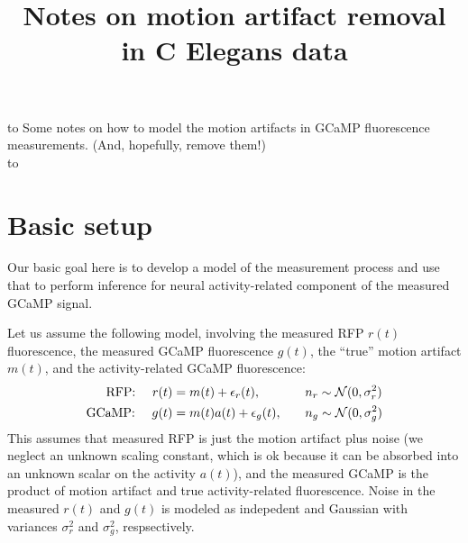 \documentclass[11pt]{article}
\newcommand{\vr}{\sigma^2_r}
\newcommand{\vg}{\sigma^2_g}
\begin{document}



\title{Notes on motion artifact removal in C Elegans data}

\maketitle

\hbox to \textwidth{\hrulefill} 
\vspace{-.1in}
Some notes on how to model the motion artifacts
in GCaMP fluorescence measurements. (And, hopefully, remove them!) \\
\hbox to \textwidth{\hrulefill}

\vspace{.5in}

\section{Basic setup}
Our basic goal here is to develop a model of the measurement process
and use that to perform inference for neural
activity-related component of the measured GCaMP signal.

Let us assume the following model, involving the measured RFP $r(t)$
fluorescence, the measured GCaMP fluorescence $g(t)$, the ``true''
motion artifact $m(t)$, and the activity-related GCaMP fluorescence:
\begin{alignat}{2}
\text{RFP: }\quad r(t) &= m(t) + \epsilon_r(t), \quad & & n_r \sim
\Nrm(0,\vr)  \label{eq:rfp} \\
\text{GCaMP: }\quad g(t) &= m(t)a(t)  + \epsilon_g(t), \quad & & n_g \sim
\Nrm(0,\vg) \label{eq:gcamp}
\end{alignat}
This assumes that measured RFP is just the motion artifact plus noise
(we neglect an unknown scaling constant, which is ok because it can be
absorbed into an unknown scalar on the activity $a(t)$), and the
measured GCaMP is the product of motion artifact and true
activity-related fluorescence.  Noise in the measured $r(t)$ and
$g(t)$ is modeled as indepedent and Gaussian with variances $\vr$ and
$\vg$, respsectively.
\end{document}
